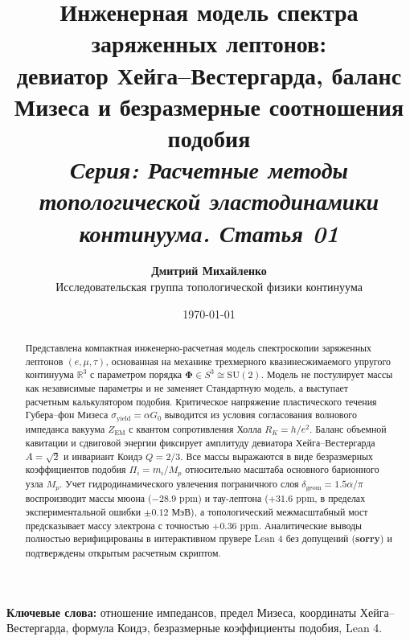 \documentclass[11pt,a4paper]{article}
\theoremstyle{definition}
\theoremstyle{remark}
\begin{document}
\title{\textbf{\Large Инженерная модель спектра заряженных лептонов:}\\
\large девиатор Хейга--Вестергарда, баланс Мизеса и безразмерные соотношения подобия\\[2mm]
\normalsize \textit{Серия: Расчетные методы топологической эластодинамики континуума. Статья 01}}

\author{\textbf{Дмитрий Михайленко}\\[1mm]
\small Исследовательская группа топологической физики континуума}

\date{\today}

\maketitle

\begin{abstract}
\noindent Представлена компактная инженерно-расчетная модель спектроскопии заряженных лептонов $(e, \mu, \tau)$, основанная на механике трехмерного квазинесжимаемого упругого континуума $\mathbb{R}^3$ с параметром порядка $\boldsymbol{\Phi} \in S^3 \cong \mathrm{SU}(2)$. Модель не постулирует массы как независимые параметры и не заменяет Стандартную модель, а выступает расчетным калькулятором подобия. Критическое напряжение пластического течения Губера--фон Мизеса $\sigma_{\mathrm{yield}} = \alpha G_0$ выводится из условия согласования волнового импеданса вакуума $Z_{\mathrm{EM}}$ с квантом сопротивления Холла $R_K = h/e^2$. Баланс объемной кавитации и сдвиговой энергии фиксирует амплитуду девиатора Хейга--Вестергарда $A = \sqrt{2}$ и инвариант Коидэ $Q = 2/3$. Все массы выражаются в виде безразмерных коэффициентов подобия $\Pi_i = m_i / M_p$ относительно масштаба основного барионного узла $M_p$. Учет гидродинамического увлечения пограничного слоя $\delta_{\mathrm{geom}} = 1.5\alpha/\pi$ воспроизводит массы мюона ($-28.9\text{ ppm}$) и тау-лептона ($+31.6\text{ ppm}$, в пределах экспериментальной ошибки $\pm 0.12$ МэВ), а топологический межмасштабный мост предсказывает массу электрона с точностью $+0.36\text{ ppm}$. Аналитические выводы полностью верифицированы в интерактивном прувере Lean 4 без допущений (\textbf{sorry}) и подтверждены открытым расчетным скриптом.
\end{abstract}

\vspace{2mm}
\noindent\textbf{Ключевые слова:} отношение импедансов, предел Мизеса, координаты Хейга--Вестергарда, формула Коидэ, безразмерные коэффициенты подобия, Lean 4.
\end{document}
